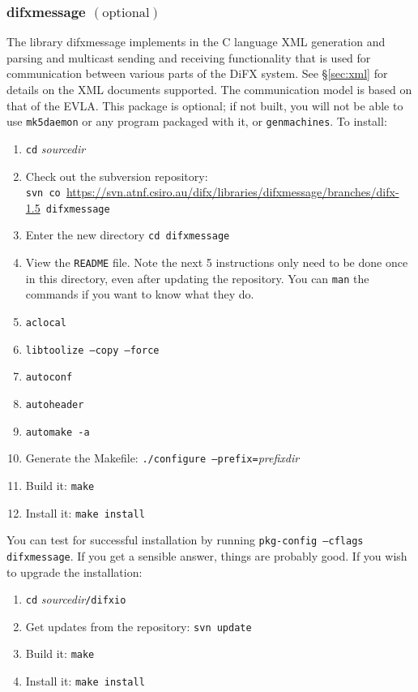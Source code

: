 
\subsubsection{difxmessage {\small $\mathrm{(optional)}$}} \label{sec:difxmessage}

The library difxmessage implements in the C language XML generation and parsing and multicast sending and receiving functionality that is used for communication between various parts of the DiFX system.
See \S\ref{sec:xml} for details on the XML documents supported.
The communication model is based on that of the EVLA.
This package is optional; if not built, you will not be able to use {\tt mk5daemon} or any program packaged with it, or {\tt genmachines}.
To install:
\begin{enumerate}
\item {\tt cd} {\em sourcedir}
\item Check out the subversion repository: \\
{\tt svn co }\url{https://svn.atnf.csiro.au/difx/libraries/difxmessage/branches/difx-1.5}{\tt\ difxmessage}
\item Enter the new directory {\tt cd difxmessage}
\item View the {\tt README} file.  
Note the next 5 instructions only need to be done once in this directory, even after updating the repository.
You can {\tt man} the commands if you want to know what they do.
\item {\tt aclocal}  
\item {\tt libtoolize --copy --force}
\item {\tt autoconf}
\item {\tt autoheader}
\item {\tt automake -a} 
\item Generate the Makefile: {\tt ./configure --prefix=}{\em prefixdir}
\item Build it: {\tt make}
\item Install it: {\tt make install}
\end{enumerate}

You can test for successful installation by running {\tt pkg-config --cflags difxmessage}.  
If you get a sensible answer, things are probably good.
If you wish to upgrade the installation:
\begin{enumerate}
\item {\tt cd} {\em sourcedir}{\tt /difxio}
\item Get updates from the repository: {\tt svn update}
\item Build it: {\tt make}
\item Install it: {\tt make install}
\end{enumerate}


